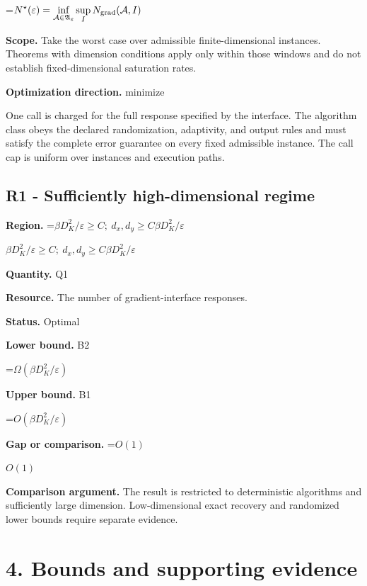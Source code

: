 \documentclass[10pt,a4paper]{article}
\newcommand{\AtlasMath}[1]{\par\begingroup\centering\setbox0=\hbox{$\displaystyle #1$}\ifdim\wd0>1.4\linewidth\typeout{ATLAS WIDE FORMULA: \the\wd0}\fi\ifdim\wd0>\linewidth\resizebox{\linewidth}{!}{\box0}\else\box0\fi\par\endgroup}
\newcommand{\AtlasInlineMath}[1]{\begingroup\setbox0=\hbox{$#1$}\ifdim\wd0>.4\linewidth\endgroup\AtlasMath{#1}\else\endgroup$#1$\fi}
\begin{document}
\AtlasMath{N^\star(\varepsilon)=\inf_{\mathcal A\in\mathfrak A_\varepsilon}\sup_I N_{\rm grad}(\mathcal A,I)}


\textbf{Scope.} Take the worst case over admissible finite-dimensional instances. Theorems with dimension conditions apply only within those windows and do not establish fixed-dimensional saturation rates.



\textbf{Optimization direction.} minimize



One call is charged for the full response specified by the interface. The algorithm class obeys the declared randomization, adaptivity, and output rules and must satisfy the complete error guarantee on every fixed admissible instance. The call cap is uniform over instances and execution paths.



\subsection{R1 - Sufficiently high-dimensional regime}


\textbf{Region.} \AtlasInlineMath{\beta D_K^2/\varepsilon\ge C;\ d_x,d_y\ge C\beta D_K^2/\varepsilon}



\textbf{Quantity.} Q1



\textbf{Resource.} The number of gradient-interface responses.



\textbf{Status.} Optimal



\textbf{Lower bound.} B2



\AtlasMath{\Omega(\beta D_K^2/\varepsilon)}


\textbf{Upper bound.} B1



\AtlasMath{O(\beta D_K^2/\varepsilon)}


\textbf{Gap or comparison.} \AtlasInlineMath{O(1)}



\textbf{Comparison argument.} The result is restricted to deterministic algorithms and sufficiently large dimension. Low-dimensional exact recovery and randomized lower bounds require separate evidence.



\section{4. Bounds and supporting evidence}
\end{document}
